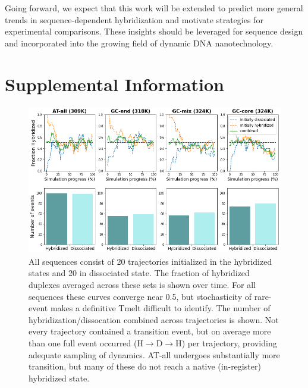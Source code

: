 \documentclass[journal=jpcbfk,manuscript=article]{achemso}
\begin{document}
Going forward, we expect that this work will be extended to predict more general trends in sequence-dependent hybridization and motivate strategies for experimental comparisons. These insights should be leveraged for sequence design and incorporated into the growing field of dynamic DNA nanotechnology. 

\newcommand{\sectionbreak}{\clearpage}
\section{\label{sec:Results}Supplemental Information}


\begin{figure}[ht!]
	\begin{center}
        \includegraphics[width=120mm, 
        scale=0.5]{Figs/figs_imp/allseq_event_count.png}
        \caption{All sequences consist of 20 trajectories initialized in the hybridized states and 20 in dissociated state. The fraction of hybridized duplexes averaged across these sets is shown over time. For all sequences these curves converge near 0.5, but stochasticity of rare-event makes a definitive Tmelt difficult to identify. The number of hybridization/dissocation combined across trajectories is shown. Not every trajectory contained a transition event, but on average more than one full event occurred (H$\rightarrow$D$\rightarrow$H) per trajectory, providing adequate sampling of dynamics. AT-all undergoes substantially more transition, but many of these do not reach a native (in-register) hybridized state.}
        \label{fig:allseq_event_count}
	\end{center}
\end{figure}
\end{document}
